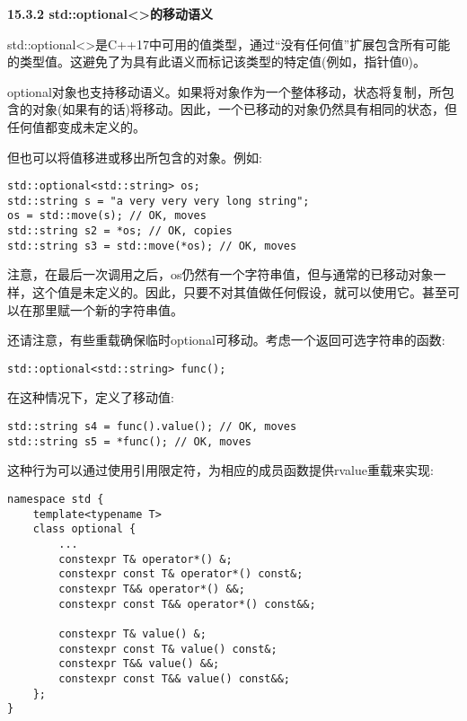 \hspace*{\fill} \par %
\textbf{15.3.2 std::optional<>的移动语义}

std::optional<>是C++17中可用的值类型，通过“没有任何值”扩展包含所有可能的类型值。这避免了为具有此语义而标记该类型的特定值(例如，指针值0)。\par

optional对象也支持移动语义。如果将对象作为一个整体移动，状态将复制，所包含的对象(如果有的话)将移动。因此，一个已移动的对象仍然具有相同的状态，但任何值都变成未定义的。\par

但也可以将值移进或移出所包含的对象。例如:\par

\begin{lstlisting}[caption={}]
std::optional<std::string> os;
std::string s = "a very very very long string";
os = std::move(s); // OK, moves
std::string s2 = *os; // OK, copies
std::string s3 = std::move(*os); // OK, moves
\end{lstlisting}

注意，在最后一次调用之后，os仍然有一个字符串值，但与通常的已移动对象一样，这个值是未定义的。因此，只要不对其值做任何假设，就可以使用它。甚至可以在那里赋一个新的字符串值。\par

还请注意，有些重载确保临时optional可移动。考虑一个返回可选字符串的函数:\par

\begin{lstlisting}[caption={}]
std::optional<std::string> func();
\end{lstlisting}

在这种情况下，定义了移动值:\par

\begin{lstlisting}[caption={}]
std::string s4 = func().value(); // OK, moves
std::string s5 = *func(); // OK, moves
\end{lstlisting}

这种行为可以通过使用引用限定符，为相应的成员函数提供rvalue重载来实现:\par

\begin{lstlisting}[caption={}]
namespace std {
	template<typename T>
	class optional {
		...
		constexpr T& operator*() &;
		constexpr const T& operator*() const&;
		constexpr T&& operator*() &&;
		constexpr const T&& operator*() const&&;
		
		constexpr T& value() &;
		constexpr const T& value() const&;
		constexpr T&& value() &&;
		constexpr const T&& value() const&&;
	};
}
\end{lstlisting}

